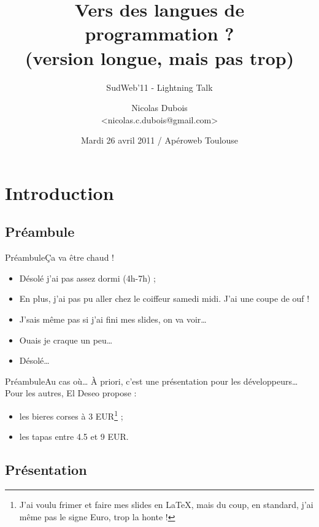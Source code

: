 \documentclass[notes]{beamer}
\title[Vers des langues de programmation ?]
    {Vers des langues de programmation ?\\
    \tiny{(version longue, mais pas trop)}}
\subtitle{SudWeb'11 - Lightning Talk}
\author[Nicolas Dubois - @duboisnicolas]
    {Nicolas Dubois\\{\small <nicolas.c.dubois@gmail.com>}}
\date{Mardi 26 avril 2011 / Apéroweb Toulouse}
\begin{document}
\def\tm{\texttrademark}
\def\r{\up{\textregistered}}
\def\sw{SudWeb'11}

\begin{frame}
\titlepage
\end{frame}

\section{Introduction}

\subsection{Préambule}

\begin{frame}{Préambule}{Ça va être chaud !}
\pause
\begin{itemize}[<+->]
\item Désolé j'ai pas assez dormi (4h-7h) ;
\item En plus, j'ai pas pu aller chez le coiffeur samedi midi. J'ai une coupe de ouf !
\item J'sais même pas si j'ai fini mes slides, on va voir…
\item Ouais je craque un peu…
\item \alert{Désolé…}
\end{itemize}
\end{frame}

\begin{frame}{Préambule}{Au cas où…}
\pause
À priori, c'est une présentation pour les développeurs…\\
\pause
\vspace*{1cm}
Pour les autres, El Deseo propose :
\pause
\begin{itemize}[<+->]
\item les bieres corses à 3 EUR\footnote{J'ai voulu frimer et faire mes slides en \LaTeX{}, mais du coup, en standard, j'ai même pas
le signe Euro, trop la honte !} ;
\item les tapas entre 4.5 et 9 EUR.
\end{itemize}
\end{frame}

\subsection{Présentation}
\end{document}
